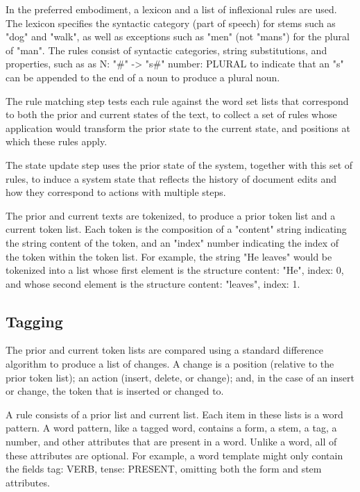 \documentclass{article}
\begin{document}
In the preferred embodiment, a lexicon and a list of inflexional rules are used.  The lexicon specifies the syntactic category (part of speech) for stems such as "dog" and "walk", as well as exceptions such as "men" (not "mans") for the plural of "man".  The rules consist of syntactic categories, string substitutions, and properties, such as as N: "\#" -> "s\#" {number: PLURAL} to indicate that an "s" can be appended to the end of a noun to produce a plural noun.

The rule matching step tests each rule against the word set lists that correspond to both the prior and current states of the text, to collect a set of rules whose application would transform the prior state to the current state, and positions at which these rules apply.

The state update step uses the prior state of the system, together with this set of rules, to induce a system state that reflects the history of document edits and how they correspond to actions with multiple steps.

The prior and current texts are tokenized, to produce a prior token list and a current token list.  Each token is the composition of a "content" string indicating the string content of the token, and an "index" number indicating the index of the token within the token list.  For example, the string "He leaves" would be tokenized into a list whose first element is the structure {content: "He", index: 0}, and whose second element is the structure {content: "leaves", index: 1}.

\subsection{Tagging}

The prior and current token lists are compared using a standard difference algorithm to produce a list of changes.  A change is a position (relative to the prior token list); an action (insert, delete, or change); and, in the case of an insert or change, the token that is inserted or changed to.

A rule consists of a prior list and current list.  Each item in these lists is a word pattern.  A word pattern, like a tagged word, contains a form, a stem, a tag, a number, and other attributes that are present in a word.  Unlike a word, all of these attributes are optional.  For example, a word template might only contain the fields {tag: VERB, tense: PRESENT}, omitting both the form and stem attributes.
\end{document}
